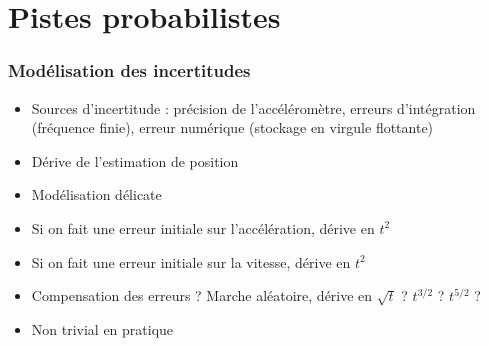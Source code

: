 \documentclass[11pt]{beamer}
\begin{document}
\section{Pistes probabilistes}
\begin{frame}
  \frametitle{Modélisation des incertitudes}
\begin{itemize}
\item Sources d'incertitude : précision de l'accéléromètre, erreurs
  d'intégration (fréquence finie), erreur numérique (stockage en
  virgule flottante)
\item Dérive de l'estimation de position
\item Modélisation délicate
\item Si on fait une erreur initiale sur l'accélération, dérive en
  $t^{2}$
\item Si on fait une erreur initiale sur la vitesse, dérive en
  $t^{2}$
\item Compensation des erreurs ? Marche aléatoire, dérive en $\sqrt t$
  ? $t^{3/2}$ ? $t^{5/2}$ ?
\item Non trivial en pratique
\end{itemize}
\end{frame}
\end{document}
